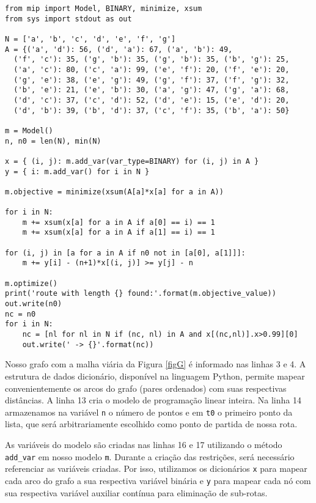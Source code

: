 \documentclass[a4paper,11pt,fleqn]{article}
\begin{document}
\begin{lstlisting}
from mip import Model, BINARY, minimize, xsum
from sys import stdout as out

N = ['a', 'b', 'c', 'd', 'e', 'f', 'g']
A = {('a', 'd'): 56, ('d', 'a'): 67, ('a', 'b'): 49, 
  ('f', 'c'): 35, ('g', 'b'): 35, ('g', 'b'): 35, ('b', 'g'): 25,
  ('a', 'c'): 80, ('c', 'a'): 99, ('e', 'f'): 20, ('f', 'e'): 20,
  ('g', 'e'): 38, ('e', 'g'): 49, ('g', 'f'): 37, ('f', 'g'): 32,
  ('b', 'e'): 21, ('e', 'b'): 30, ('a', 'g'): 47, ('g', 'a'): 68,
  ('d', 'c'): 37, ('c', 'd'): 52, ('d', 'e'): 15, ('e', 'd'): 20,
  ('d', 'b'): 39, ('b', 'd'): 37, ('c', 'f'): 35, ('b', 'a'): 50}
  
m = Model()
n, n0 = len(N), min(N)

x = { (i, j): m.add_var(var_type=BINARY) for (i, j) in A }
y = { i: m.add_var() for i in N }

m.objective = minimize(xsum(A[a]*x[a] for a in A))

for i in N:
    m += xsum(x[a] for a in A if a[0] == i) == 1
    m += xsum(x[a] for a in A if a[1] == i) == 1
	
for (i, j) in [a for a in A if n0 not in [a[0], a[1]]]:
    m += y[i] - (n+1)*x[(i, j)] >= y[j] - n
	
m.optimize()
print('route with length {} found:'.format(m.objective_value))
out.write(n0)
nc = n0
for i in N:
    nc = [nl for nl in N if (nc, nl) in A and x[(nc,nl)].x>0.99][0]
    out.write(' -> {}'.format(nc))
\end{lstlisting}


Nosso grafo com a malha viária da Figura \ref{figG} é informado nas linhas 3 e 4. A estrutura de dados dicionário, disponível na linguagem Python, permite mapear convenientemente os arcos do grafo (pares ordenados) com suas respectivas distâncias. A linha 13 cria o modelo de programação linear inteira. Na linha 14 armazenamos na variável \texttt{n} o número de pontos e em \texttt{t0} o primeiro ponto da lista, que será arbitrariamente escolhido como ponto de partida de nossa rota. 

As variáveis do modelo são criadas nas linhas 16 e 17 utilizando o método \texttt{add\_var} em nosso modelo \texttt{m}. Durante a criação das restrições, será necessário referenciar as variáveis criadas. Por isso, utilizamos os dicionários \texttt{x} para mapear cada arco do grafo a sua respectiva variável binária e \texttt{y} para mapear cada nó com sua respectiva variável auxiliar contínua para eliminação de sub-rotas.
\end{document}
